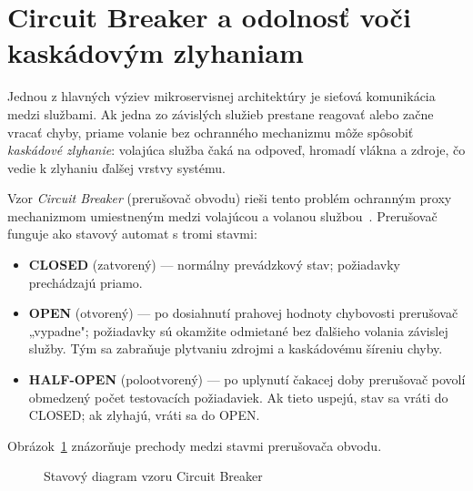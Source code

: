 \section{Circuit Breaker a odolnosť voči kaskádovým zlyhaniam}

Jednou z hlavných výziev mikroservisnej architektúry je sieťová komunikácia medzi službami. Ak jedna zo závislých služieb prestane reagovať alebo začne vracať chyby, priame volanie bez ochranného mechanizmu môže spôsobiť \emph{kaskádové zlyhanie}: volajúca služba čaká na odpoveď, hromadí vlákna a zdroje, čo vedie k zlyhaniu ďalšej vrstvy systému.

Vzor \emph{Circuit Breaker} (prerušovač obvodu) rieši tento problém ochranným proxy mechanizmom umiestneným medzi volajúcou a volanou službou~\cite{Richardson2018}. Prerušovač funguje ako stavový automat s tromi stavmi:

\begin{itemize}
    \item \textbf{CLOSED} (zatvorený) — normálny prevádzkový stav; požiadavky prechádzajú priamo.
    \item \textbf{OPEN} (otvorený) — po dosiahnutí prahovej hodnoty chybovosti prerušovač „vypadne"; požiadavky sú okamžite odmietané bez ďalšieho volania závislej služby. Tým sa zabraňuje plytvaniu zdrojmi a kaskádovému šíreniu chyby.
    \item \textbf{HALF-OPEN} (polootvorený) — po uplynutí čakacej doby prerušovač povolí obmedzený počet testovacích požiadaviek. Ak tieto uspejú, stav sa vráti do CLOSED; ak zlyhajú, vráti sa do OPEN.
\end{itemize}

Obrázok~\ref{fig:circuit-breaker} znázorňuje prechody medzi stavmi prerušovača obvodu.

\begin{figure}[H]
\centering
{}
\caption{Stavový diagram vzoru Circuit Breaker}
\label{fig:circuit-breaker}
\end{figure}

